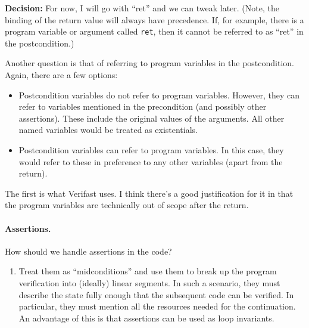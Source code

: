\documentclass[a4paper]{article}
\begin{document}
\textbf{Decision:}
For now, I will go with ``ret'' and we can tweak later.
(Note, the binding of the return value will always have precedence.
If, for example, there is a program variable or argument called \texttt{ret}, then it cannot be referred to as ``ret'' in the postcondition.)

Another question is that of referring to program variables in the postcondition.
Again, there are a few options:
\begin{itemize}
  \item Postcondition variables do not refer to program variables.
    However, they can refer to variables mentioned in the precondition (and possibly other assertions).
    These include the original values of the arguments.
    All other named variables would be treated as existentials.
  \item Postcondition variables can refer to program variables.
    In this case, they would refer to these in preference to any other variables (apart from the return).
\end{itemize}

The first is what Verifast uses.
I think there's a good justification for it in that the program variables are technically out of scope after the return.

\paragraph{Assertions.}
How should we handle assertions in the code?
\begin{enumerate}
  \item Treat them as ``midconditions'' and use them to break up the program verification into (ideally) linear segments.
    In such a scenario, they must describe the state fully enough that the subsequent code can be verified.
    In particular, they must mention all the resources needed for the continuation.
    An advantage of this is that assertions can be used as loop invariants.
\end{enumerate}
\end{document}
